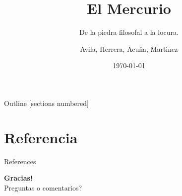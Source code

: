 \documentclass[aspectratio=169,sn-mathphys-num]{beamer}
\title{El Mercurio}
\subtitle{De la piedra filosofal a la locura.}
\author{Avila, Herrera, Acuña, Martinez}
\institute{Universidad Distrital Francisco José de Caldas}
\date{\today}
\begin{document}
\begin{frame}
	\titlepage
\end{frame}

\begin{frame}{Outline}
	[sections numbered]
	\tableofcontents
\end{frame}









\section{Referencia}
\begin{frame}[allowframebreaks]{References}
	\printbibliography
	\nocite{*}
\end{frame}

\begin{frame}[plain]
	\centering
	\vspace{1cm}
	{\Huge \textbf{Gracias!}}\\[1cm]
	{\large Preguntas o comentarios?}
\end{frame}
\end{document}
